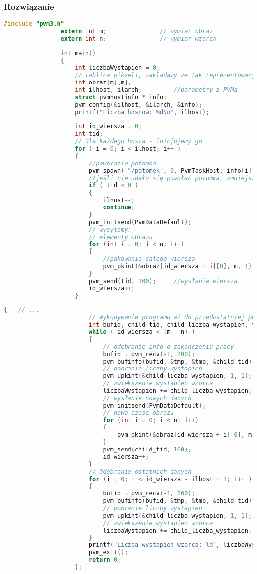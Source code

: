 			\subsubsection{Rozwiązanie}
				\begin{lstlisting}[language=C]
				#include "pvm3.h"
				extern int m;				// wymiar obraz
				extern int n;				// wymiar wzorca
				
				int main()
				{
					int liczbaWystapien = 0;
					// tablica pikseli, zakladamy ze tak reprezentowany jest obraz
					int obraz[m][m];		
					int ilhost, ilarch;			//parametry z PVMa
					struct pvmhostinfo * info;
					pvm_config(&ilhost, &ilarch, &info);
					printf("Liczba hostow: %d\n", ilhost);
					
					int id_wiersza = 0;
					int tid;
					// Dla każdego hosta - inicjujemy go
					for ( i = 0; i < ilhost; i++ )
					{
						//powołanie potomka
						pvm_spawn( "/potomek", 0, PvmTaskHost, info[i].hi_name, 1, &tid);
						//jeśli nie udało się powołać potomka, zmniejszamy liczbę hostów i kontynuujemy	
						if ( tid < 0 )
						{
							ilhost--;	
							continue;
						}
						pvm_initsend(PvmDataDefault);
						// wysyłamy:
						// elementy obrazu
						for (int i = 0; i < n; i++)
						{
							//pakowanie całego wiersza
							pvm_pkint(&obraz[id_wiersza + i][0], m, 1);
						}
						pvm_send(tid, 100);		//wysłanie wiersza
						id_wiersza++;
					}
				\end{lstlisting}
				\newpage
				\begin{lstlisting}[language=C]
					{ 	// ...
						// Wykonywanie programu aż do przedostatniej pętli
						int bufid, child_tid, child_liczba_wystapien, tmp;
						while ( id_wiersza < (m - n) )
						{
							// odebranie info o zakończeniu pracy
							bufid = pvm_recv(-1, 200);
							pvm_bufinfo(bufid, &tmp, &tmp, &child_tid);
							// pobranie liczby wystapien
							pvm_upkint(&child_liczba_wystapien, 1, 1);
							// zwiekszenie wystapien wzorca
							liczbaWystapien += child_liczba_wystapien;
							// wysłanie nowych danych
							pvm_initsend(PvmDataDefault);
							// nowa czesc obrazu
							for (int i = 0; i < n; i++)
							{
								pvm_pkint(&obraz[id_wiersza + i][0], m, 1);
							}
							pvm_send(child_tid, 100);
							id_wiersza++;
						}
						// Odebranie ostatnich danych
						for	(i = 0; i < id_wiersza - ilhost + 1; i++ )
						{
							bufid = pvm_recv(-1, 200);
							pvm_bufinfo(bufid, &tmp, &tmp, &child_tid);
							// pobranie liczby wystapien
							pvm_upkint(&child_liczba_wystapien, 1, 1);
							// zwiekszenie wystapien wzorca
							liczbaWystapien += child_liczba_wystapien;
						}
						printf("Liczba wystapien wzorca: %d", liczbaWystapien);
						pvm_exit();
						return 0;
					};
				\end{lstlisting}
		\newpage
